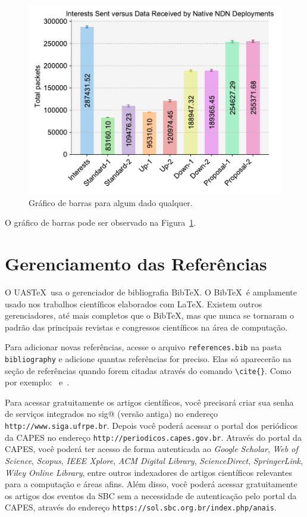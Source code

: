 \documentclass[portuguese,noindentfirst]{UASTeX} %
\begin{document}
\begin{figure}[ht]
	\centering
	\includegraphics[width=.6\textwidth]{images/charts/bar}
	\caption{Gráfico de barras para algum dado qualquer.}
	\label{fig:bar}
\end{figure}

O gráfico de barras pode ser observado na Figura~\ref{fig:bar}.
\lipsum[1-1]

\section{Gerenciamento das Referências}\label{sec:reference_management}
O UAS\TeX~usa o gerenciador de bibliografia Bib\TeX. O Bib\TeX~é amplamente usado nos trabalhos científicos elaborados com \LaTeX. Existem outros gerenciadores, até mais completos que o Bib\TeX, mas que nunca se tornaram o padrão das principais revistas e congressos científicos na área de computação.

Para adicionar novas referências, acesse o arquivo {\tt references.bib} na pasta {\tt bibliography} e adicione quantas referências for preciso. Elas só aparecerão na seção de referências quando forem citadas através do comando {\tt\textbackslash  cite\{\}}. Como por exemplo:~\cite{knuth:91} e~\cite{lamport:94}.

Para acessar gratuitamente os artigos científicos, você precisará criar sua senha de serviços integrados no sig@ (versão antiga) no endereço {\tt http://www.siga.ufrpe.br}. Depois você poderá acessar o portal dos periódicos da \ac{CAPES} no endereço {\tt http://periodicos.capes.gov.br}. Através do portal da \ac{CAPES}, você poderá ter acesso de forma autenticada ao \emph{Google Scholar}, \emph{Web of Science}, \emph{Scopus}, \emph{IEEE Xplore}, \emph{ACM Digital Library}, \emph{ScienceDirect}, \emph{SpringerLink}, \emph{Wiley Online Library}, entre outros indexadores de artigos científicos relevantes para a computação e áreas afins. Além disso, você poderá acessar gratuitamente os artigos dos eventos da \ac{SBC} sem a necessidade de autenticação pelo portal da \ac{CAPES}, através do endereço {\tt https://sol.sbc.org.br/index.php/anais}.
\end{document}

